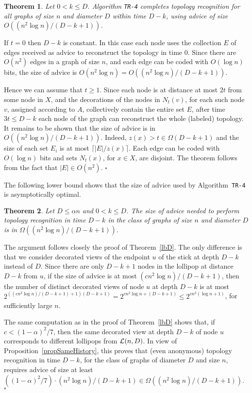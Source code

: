 \documentclass{article}
\newcommand{\cL}{{\cal L}}
\newcommand*{\qed}{\hfill\ensuremath{\square}}
\newtheorem{theorem}{Theorem}[section]
\newenvironment{proof}{\noindent{\bf Proof:}}{\qed}
\begin{document}
\begin{theorem}\label{ubTimeD-k}
Let $0< k \le D$.
Algorithm {\tt TR-4} completes topology recognition for all graphs of size $n$ and diameter $D$ within time $D-k$, using advice of size $O((n^2\log n)/(D-k+1))$.
\end{theorem}
\begin{proof}
If $t=0$ then $D-k$ is constant. In this case each node uses the collection $E$ of edges received as advice to reconstruct the topology in time $0$.
Since there are $O(n^2)$ edges in a graph of size $n$, and each edge can be coded with $O(\log n)$ bits, the size of advice is $O(n^2 \log n)=O((n^2 \log n)/(D-k+1))$.

Hence we can assume that $t\ge 1$.
Since each node is at distance at most $2t$ from some node in $X$, and the decorations of the nodes in $N_t(v)$, for each  such node $v$, assigned according to $A$, collectively contain the entire set $E$, after time $3t\le D-k$ each node of the graph can reconstruct the whole (labeled) topology.
It remains to be shown that the size of advice is in $O((n^2\log n)/(D-k+1))$. Indeed, $z(x) > t \in \Omega(D-k+1)$ and the size of each set $E_i$ is at most $\lceil |E| / z(x) \rceil$. Each edge can be coded with $O(\log n)$ bits and sets $N_t(x)$, for $x\in X$, are disjoint.
The theorem follows from the fact that $|E|\in O(n^2)$.
\end{proof}



The following lower bound shows that the size of advice used by Algorithm~{\tt TR-4} is asymptotically optimal.

\begin{theorem}\label{lbD-k}
Let $ D\le  \alpha n$ and $0 < k \le D$.
The size of advice needed to perform topology recognition in time $D-k$ in the class of graphs of size $n$ and diameter $D$
is in $\Omega((n^2 \log n)/(D-k+1))$.
\end{theorem}
\begin{proof}
The argument follows closely the proof of Theorem~\ref{lbD}. The only difference is that we consider decorated views of the endpoint $u$ of the stick at depth $D-k$ instead of $D$. Since there are only $D-k+1$ nodes in the lollipop at distance $D-k$ from $u$, if the  size of advice is at most  $(cn^2\log n)/(D-k+1)$, then the number of distinct decorated views of node $u$ at depth $D-k$ is at most  $2^{((cn^2 \log n)/(D-k +1)  + 1) (D-k +1)}= 2^{cn^2 \log n  + (D-k +1)} \le 2^{cn^2 (\log n  +1)}$, for sufficiently large $n$.

The same computation as in the proof of Theorem~\ref{lbD} shows that, if $c<(1-\alpha)^2/7$, then the same decorated view at depth $D-k$ of node $u$ corresponds to different lollipops from $\cL(n,D)$. In view of Proposition~\ref{propSameHistory}, this proves that (even anonymous) topology recognition in time $D-k$, for the class of graphs of diameter $D$ and size $n$, requires advice of size at least $((1- \alpha)^2/7) \cdot (n^2 \log n) /(D-k+1) \in \Omega((n^2 \log n)/(D-k+1))$.
\end{proof}
\end{document}
